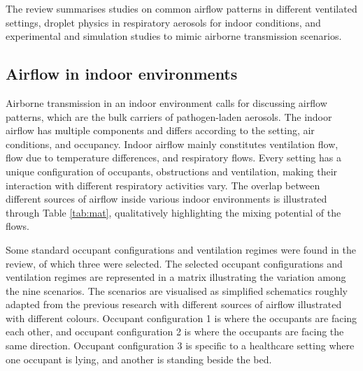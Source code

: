 \documentclass[a4paper,12pt]{elsarticle}
\begin{document}
The review summarises studies on common airflow patterns in different ventilated settings, droplet physics in respiratory aerosols for indoor conditions, and experimental and simulation studies to mimic airborne transmission scenarios.

\subsection{Airflow in indoor environments}

Airborne transmission in an indoor environment calls for discussing airflow patterns, which are the bulk carriers of pathogen-laden aerosols. The indoor airflow has multiple components and differs according to the setting, air conditions, and occupancy. Indoor airflow mainly constitutes ventilation flow, flow due to temperature differences, and respiratory flows. Every setting has a unique configuration of occupants, obstructions and ventilation, making their interaction with different respiratory activities vary. The overlap between different sources of airflow inside various indoor environments is illustrated through Table \ref{tab:mat}, qualitatively highlighting the mixing potential of the flows.

Some standard occupant configurations and ventilation regimes were found in the review, of which three were selected. The selected occupant configurations and ventilation regimes are represented in a matrix illustrating the variation among the nine scenarios. The scenarios are visualised as simplified schematics roughly adapted from the previous research with different sources of airflow illustrated with different colours. Occupant configuration 1 is where the occupants are facing each other, and occupant configuration 2 is where the occupants are facing the same direction. Occupant configuration 3 is specific to a healthcare setting where one occupant is lying, and another is standing beside the bed.
\end{document}
